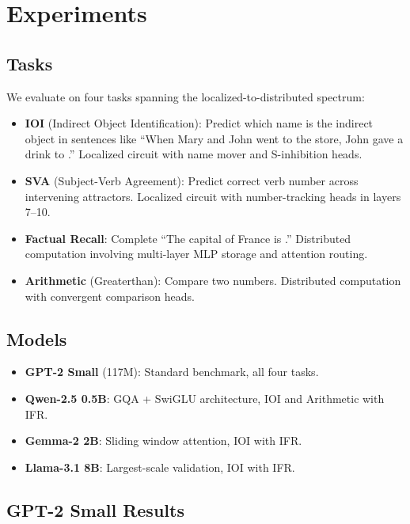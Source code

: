 \documentclass[11pt,a4paper]{article}
\begin{document}
\section{Experiments}
\label{sec:experiments}

\subsection{Tasks}
We evaluate on four tasks spanning the localized-to-distributed spectrum:
\begin{itemize}
    \item \textbf{IOI} (Indirect Object Identification): Predict which name is the indirect object in sentences like ``When Mary and John went to the store, John gave a drink to \underline{\hspace{1em}}.'' Localized circuit with name mover and S-inhibition heads.
    \item \textbf{SVA} (Subject-Verb Agreement): Predict correct verb number across intervening attractors. Localized circuit with number-tracking heads in layers 7--10.
    \item \textbf{Factual Recall}: Complete ``The capital of France is \underline{\hspace{1em}}.'' Distributed computation involving multi-layer MLP storage and attention routing.
    \item \textbf{Arithmetic} (Greaterthan): Compare two numbers. Distributed computation with convergent comparison heads.
\end{itemize}

\subsection{Models}
\begin{itemize}
    \item \textbf{GPT-2 Small} (117M): Standard benchmark, all four tasks.
    \item \textbf{Qwen-2.5 0.5B}: GQA + SwiGLU architecture, IOI and Arithmetic with IFR.
    \item \textbf{Gemma-2 2B}: Sliding window attention, IOI with IFR.
    \item \textbf{Llama-3.1 8B}: Largest-scale validation, IOI with IFR.
\end{itemize}

\subsection{GPT-2 Small Results}
\end{document}
